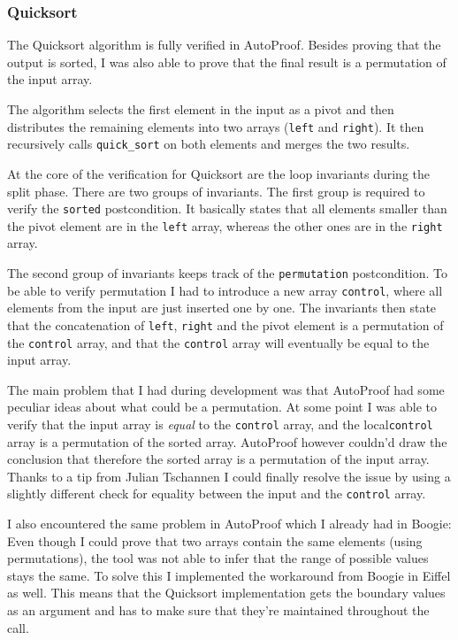 \documentclass[a4paper,10pt]{article}
\begin{document}
\subsubsection{Quicksort}

The Quicksort algorithm is fully verified in AutoProof.
Besides proving that the output is sorted, I was also able to prove that the final result is a permutation of the input array.

The algorithm selects the first element in the input as a pivot and then distributes the remaining elements into two arrays (\lstinline!left! and \lstinline!right!).
It then recursively calls \lstinline!quick_sort! on both elements and merges the two results.

At the core of the verification for Quicksort are the loop invariants during the split phase.
There are two groups of invariants.
The first group is required to verify the \lstinline!sorted! postcondition.
It basically states that all elements smaller than the pivot element are in the \lstinline!left! array, whereas the other ones are in the \lstinline!right! array.

The second group of invariants keeps track of the \lstinline!permutation! postcondition.
To be able to verify permutation I had to introduce a new array \lstinline!control!, where all elements from the input are just inserted one by one.
The invariants then state that the concatenation of \lstinline!left!, \lstinline!right! and the pivot element is a permutation of the \lstinline!control! array,
and that the \lstinline!control! array will eventually be equal to the input array.

The main problem that I had during development was that AutoProof had some peculiar ideas about what could be a permutation.
At some point I was able to verify that the input array is \emph{equal} to the \lstinline!control! array, and the local\lstinline!control! array is a permutation of the sorted array.
AutoProof however couldn'd draw the conclusion that therefore the sorted array is a permutation of the input array.
Thanks to a tip from Julian Tschannen I could finally resolve the issue by using a slightly different check for equality between the input and the \lstinline!control! array.

I also encountered the same problem in AutoProof which I already had in Boogie:
Even though I could prove that two arrays contain the same elements (using permutations), the tool was not able to infer that the range of possible values stays the same.
To solve this I implemented the workaround from Boogie in Eiffel as well.
This means that the Quicksort implementation gets the boundary values as an argument and has to make sure that they're maintained throughout the call.
\end{document}
